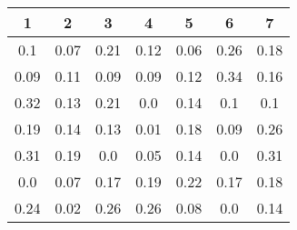 \begin{table}[htb]
    \centering
    \begin{tabular}{@{}ccccccc@{}}
        \toprule
        1 & 2 & 3 & 4 & 5 & 6 & 7 \\
        \midrule
        0.1 & 0.07 & 0.21 & 0.12 & 0.06 & 0.26 & 0.18 \\
        0.09 & 0.11 & 0.09 & 0.09 & 0.12 & 0.34 & 0.16 \\
        0.32 & 0.13 & 0.21 & 0.0 & 0.14 & 0.1 & 0.1 \\
        0.19 & 0.14 & 0.13 & 0.01 & 0.18 & 0.09 & 0.26 \\
        0.31 & 0.19 & 0.0 & 0.05 & 0.14 & 0.0 & 0.31 \\
        0.0 & 0.07 & 0.17 & 0.19 & 0.22 & 0.17 & 0.18 \\
        0.24 & 0.02 & 0.26 & 0.26 & 0.08 & 0.0 & 0.14 \\
        \bottomrule
    \end{tabular}
\end{table}